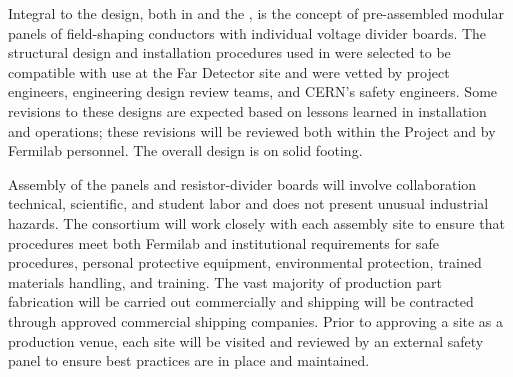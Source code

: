 Integral to the   design, both in  and the , is the concept of pre-assembled modular panels of field-shaping conductors with individual voltage divider boards. The structural design and installation procedures used in  were selected to be compatible with use at the Far Detector site and were vetted by project engineers, engineering design review teams, and CERN's safety engineers. Some revisions to these designs are expected based on lessons learned in installation and operations; these revisions will be reviewed both within the Project and by Fermilab  personnel. The overall design is on solid footing. 

Assembly of the  panels and resistor-divider boards will involve collaboration technical, scientific, and student labor and  does not present unusual industrial hazards. The  consortium will work closely with each assembly site to ensure that procedures meet both Fermilab and institutional requirements for safe procedures, personal protective equipment, environmental protection, trained materials handling, and training. The vast majority of production part fabrication will be carried out commercially and shipping will be contracted through approved commercial shipping companies. Prior to approving a site as a production venue, each site will be visited and reviewed by an external safety panel to ensure best practices are in place and maintained. 

%



